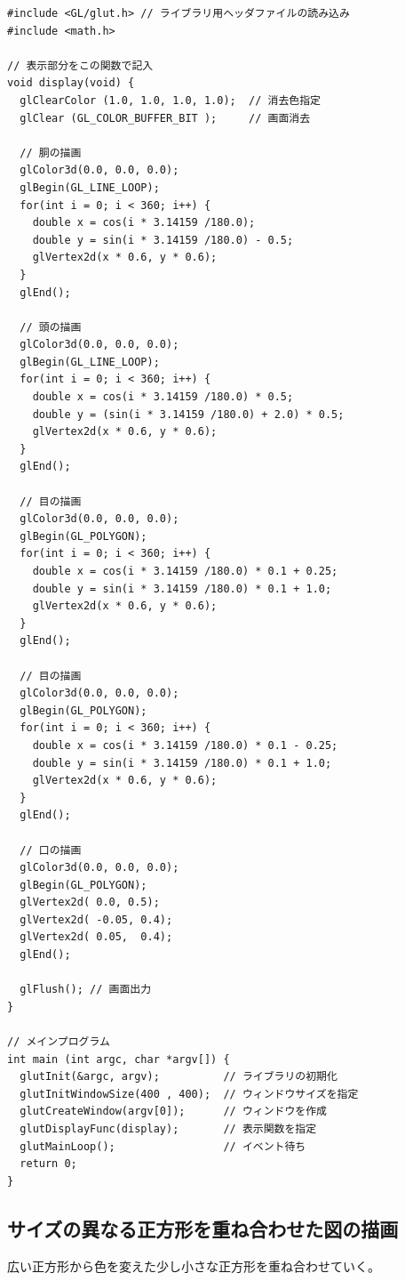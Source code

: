 \documentclass{scrartcl}
\begin{document}
\begin{verbatim}
#include <GL/glut.h> // ライブラリ用ヘッダファイルの読み込み
#include <math.h>

// 表示部分をこの関数で記入
void display(void) {        
  glClearColor (1.0, 1.0, 1.0, 1.0);  // 消去色指定
  glClear (GL_COLOR_BUFFER_BIT );     // 画面消去

  // 胴の描画
  glColor3d(0.0, 0.0, 0.0);
  glBegin(GL_LINE_LOOP);
  for(int i = 0; i < 360; i++) {
    double x = cos(i * 3.14159 /180.0);
    double y = sin(i * 3.14159 /180.0) - 0.5;
    glVertex2d(x * 0.6, y * 0.6); 
  }
  glEnd();

  // 頭の描画
  glColor3d(0.0, 0.0, 0.0); 
  glBegin(GL_LINE_LOOP);
  for(int i = 0; i < 360; i++) {
    double x = cos(i * 3.14159 /180.0) * 0.5;
    double y = (sin(i * 3.14159 /180.0) + 2.0) * 0.5;
    glVertex2d(x * 0.6, y * 0.6); 
  }
  glEnd();

  // 目の描画
  glColor3d(0.0, 0.0, 0.0); 
  glBegin(GL_POLYGON);
  for(int i = 0; i < 360; i++) {
    double x = cos(i * 3.14159 /180.0) * 0.1 + 0.25;
    double y = sin(i * 3.14159 /180.0) * 0.1 + 1.0;
    glVertex2d(x * 0.6, y * 0.6); 
  }
  glEnd();

  // 目の描画
  glColor3d(0.0, 0.0, 0.0); 
  glBegin(GL_POLYGON);
  for(int i = 0; i < 360; i++) {
    double x = cos(i * 3.14159 /180.0) * 0.1 - 0.25;
    double y = sin(i * 3.14159 /180.0) * 0.1 + 1.0;
    glVertex2d(x * 0.6, y * 0.6); 
  }
  glEnd();

  // 口の描画
  glColor3d(0.0, 0.0, 0.0); 
  glBegin(GL_POLYGON); 
  glVertex2d( 0.0, 0.5);
  glVertex2d( -0.05, 0.4);
  glVertex2d( 0.05,  0.4);
  glEnd();

  glFlush(); // 画面出力
}

// メインプログラム
int main (int argc, char *argv[]) { 
  glutInit(&argc, argv);          // ライブラリの初期化
  glutInitWindowSize(400 , 400);  // ウィンドウサイズを指定
  glutCreateWindow(argv[0]);      // ウィンドウを作成
  glutDisplayFunc(display);       // 表示関数を指定
  glutMainLoop();                 // イベント待ち
  return 0;
}
\end{verbatim}


\subsection{サイズの異なる正方形を重ね合わせた図の描画}
\label{sec:org6463f7d}
広い正方形から色を変えた少し小さな正方形を重ね合わせていく。\\
\end{document}

